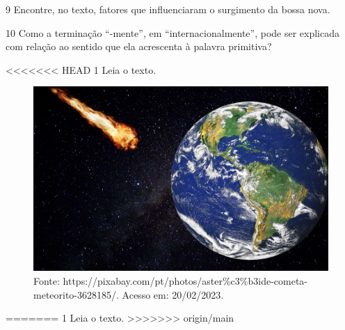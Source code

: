 \num{9} Encontre, no texto, fatores que influenciaram o surgimento da bossa nova.



\num{10} Como a terminação “-mente”, em “internacionalmente”, pode ser explicada com relação ao sentido que ela acrescenta à palavra primitiva?




<<<<<<< HEAD
\num{1} Leia o texto.

\begin{figure}[htpb!]
\includegraphics[width=.5\textwidth]{./imgs/img3.jpg}
\caption{Fonte: https://pixabay.com/pt/photos/aster\%c3\%b3ide-cometa-meteorito-3628185/. Acesso em: 20/02/2023.}
\end{figure}
=======
\num{1} Leia o texto.\medskip
>>>>>>> origin/main

